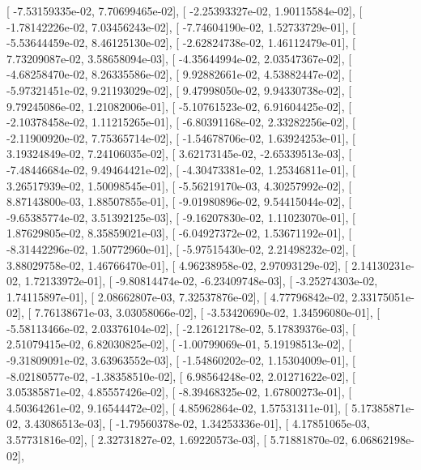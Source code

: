 \documentclass{article}
\begin{document}
       [ -7.53159335e-02,   7.70699465e-02],
       [ -2.25393327e-02,   1.90115584e-02],
       [ -1.78142226e-02,   7.03456243e-02],
       [ -7.74604190e-02,   1.52733729e-01],
       [ -5.53644459e-02,   8.46125130e-02],
       [ -2.62824738e-02,   1.46112479e-01],
       [  7.73209087e-02,   3.58658094e-03],
       [ -4.35644994e-02,   2.03547367e-02],
       [ -4.68258470e-02,   8.26335586e-02],
       [  9.92882661e-02,   4.53882447e-02],
       [ -5.97321451e-02,   9.21193029e-02],
       [  9.47998050e-02,   9.94330738e-02],
       [  9.79245086e-02,   1.21082006e-01],
       [ -5.10761523e-02,   6.91604425e-02],
       [ -2.10378458e-02,   1.11215265e-01],
       [ -6.80391168e-02,   2.33282256e-02],
       [ -2.11900920e-02,   7.75365714e-02],
       [ -1.54678706e-02,   1.63924253e-01],
       [  3.19324849e-02,   7.24106035e-02],
       [  3.62173145e-02,  -2.65339513e-03],
       [ -7.48446684e-02,   9.49464421e-02],
       [ -4.30473381e-02,   1.25346811e-01],
       [  3.26517939e-02,   1.50098545e-01],
       [ -5.56219170e-03,   4.30257992e-02],
       [  8.87143800e-03,   1.88507855e-01],
       [ -9.01980896e-02,   9.54415044e-02],
       [ -9.65385774e-02,   3.51392125e-03],
       [ -9.16207830e-02,   1.11023070e-01],
       [  1.87629805e-02,   8.35859021e-03],
       [ -6.04927372e-02,   1.53671192e-01],
       [ -8.31442296e-02,   1.50772960e-01],
       [ -5.97515430e-02,   2.21498232e-02],
       [  3.88029758e-02,   1.46766470e-01],
       [  4.96238958e-02,   2.97093129e-02],
       [  2.14130231e-02,   1.72133972e-01],
       [ -9.80814474e-02,  -6.23409748e-03],
       [ -3.25274303e-02,   1.74115897e-01],
       [  2.08662807e-03,   7.32537876e-02],
       [  4.77796842e-02,   2.33175051e-02],
       [  7.76138671e-03,   3.03058066e-02],
       [ -3.53420690e-02,   1.34596080e-01],
       [ -5.58113466e-02,   2.03376104e-02],
       [ -2.12612178e-02,   5.17839376e-03],
       [  2.51079415e-02,   6.82030825e-02],
       [ -1.00799069e-01,   5.19198513e-02],
       [ -9.31809091e-02,   3.63963552e-03],
       [ -1.54860202e-02,   1.15304009e-01],
       [ -8.02180577e-02,  -1.38358510e-02],
       [  6.98564248e-02,   2.01271622e-02],
       [  3.05385871e-02,   4.85557426e-02],
       [ -8.39468325e-02,   1.67800273e-01],
       [  4.50364261e-02,   9.16544472e-02],
       [  4.85962864e-02,   1.57531311e-01],
       [  5.17385871e-02,   3.43086513e-03],
       [ -1.79560378e-02,   1.34253336e-01],
       [  4.17851065e-03,   3.57731816e-02],
       [  2.32731827e-02,   1.69220573e-03],
       [  5.71881870e-02,   6.06862198e-02],
\end{document}
